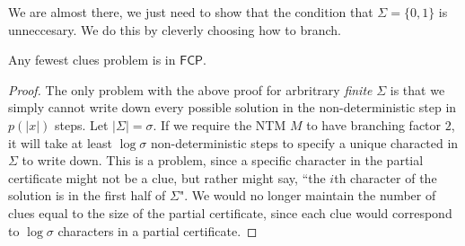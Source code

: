\documentclass[runningheads,a4paper]{llncs}
\begin{document}
We are almost there, we just need to show that the condition that $\Sigma = \{ 0, 1\}$ is unneccesary. We do this by cleverly choosing how to branch.

\begin{proposition}
Any fewest clues problem is in $\mathsf{FCP}$.
\end{proposition}

\begin{proof}
The only problem with the above proof for arbritrary \emph{finite} $\Sigma$ is that we simply cannot write down every possible solution in the non-deterministic step in $p(|x|)$ steps. Let $|\Sigma| = \sigma$. If we require the NTM $M$ to have branching factor $2$, it will take at least $\log \sigma$ non-deterministic steps to specify a unique characted in $\Sigma$ to write down. This is a problem, since a specific character in the partial certificate might not be a clue, but rather might say, ``the $i$th character of the solution is in the first half of $\Sigma$". We would no longer maintain the number of clues equal to the size of the partial certificate, since each clue would correspond to $\log \sigma$ characters in a partial certificate.


\end{proof}
\end{document}
